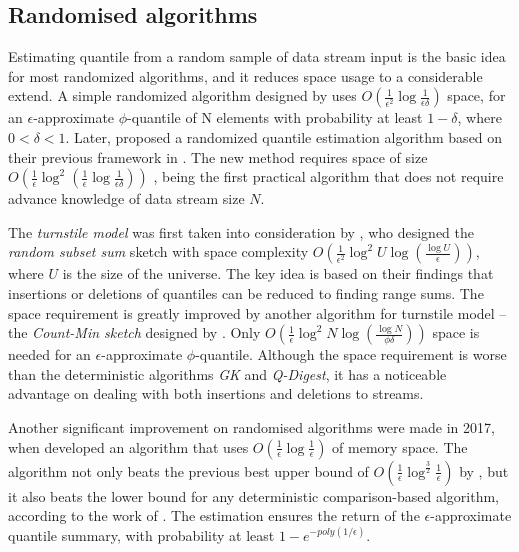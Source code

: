 \subsection{Randomised algorithms}
\label{randomised}

Estimating quantile from a random sample of data stream input is the basic idea for most randomized algorithms, and it reduces space usage to a considerable extend.
A simple randomized algorithm designed by \citeauthor{floydExpectedTimeBounds1975}\cite{floydExpectedTimeBounds1975} uses $O(\frac{1}{\epsilon^2} \log \frac{1}{\epsilon \delta})$ space, for an $\epsilon$-approximate $\phi$-quantile of N elements with probability at least $1 - \delta$, where $0 < \delta < 1$.
Later, \citeauthor{mankuRandomSamplingTechniques1999}\cite{mankuRandomSamplingTechniques1999} proposed a randomized quantile estimation algorithm based on their previous framework in \cite{mankuApproximateMediansOther1998}. The new method requires space of size 
$O(
    \frac{1}{\epsilon} \log^2 
    (\frac{1}{\epsilon} 
        \log \frac{1}{\epsilon \delta}
    )
)
$
, being the first practical algorithm that does not require advance knowledge of data stream size $N$.

The \textit{turnstile model} was first taken into consideration by \citeauthor{gilbertChapter40How2002}\cite{gilbertChapter40How2002}, who designed the \textit{random subset sum} sketch with space complexity 
$O(\frac{1}{\epsilon^2} \log^2 U \log (\frac{\log U}{\epsilon}))$, where $U$ is the size of the universe. 
The key idea is based on their findings that insertions or deletions of quantiles can be reduced to finding range sums.
The space requirement is greatly improved by another algorithm for turnstile model -- the \textit{Count-Min sketch} designed by \citeauthor{cormodeImprovedDataStream2005}\cite{cormodeImprovedDataStream2005}. Only 
$O(\frac{1}{\epsilon} \log^2 N \log (\frac{\log N}{\phi \delta}))$ space is needed for an $\epsilon$-approximate $\phi$-quantile. Although the space requirement is worse than the deterministic algorithms \textit{GK} and \textit{Q-Digest}, it has a noticeable advantage on dealing with both insertions and deletions to streams.

Another significant improvement on randomised algorithms were made in 2017, when \citeauthor{felberRandomizedOnlineQuantile2017}\cite{felberRandomizedOnlineQuantile2017} developed an algorithm that uses $O(\frac{1}{\epsilon}\log \frac{1}{\epsilon})$ of memory space. The algorithm not only beats the previous best upper bound of $O(\frac{1}{\epsilon}\log^{\frac{3}{2}}\frac{1}{\epsilon})$ by \citeauthor{agarwalMergeableSummaries2013}\cite{agarwalMergeableSummaries2013}, but it also beats the lower bound for any deterministic comparison-based algorithm, according to the work of \citeauthor{hungLogSpaceLower2010}\cite{hungLogSpaceLower2010}. The estimation ensures the return of the $\epsilon$-approximate quantile summary, with probability at least $1-e^{-poly(1/\epsilon)}$.


